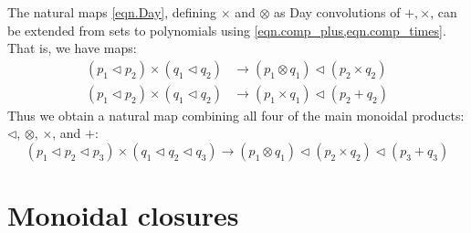 \documentclass[11pt, one side, article]{memoir}
\newcommand{\myred}[1]{{\color{red!60!black}#1}}
\newcommand{\mygreen}[1]{{\color{green!40!black}#1}}
\theoremstyle{definition}
\theoremstyle{plain}
\newcommand{\Cat}[1]{\mathbf{#1}}%
\newcommand{\nn}{\mathbb{N}}
\newcommand{\yon}{\mathcal{y}}
\newcommand{\poly}{\Cat{Poly}}
\newcommand{\0}{\textsf{0}}
\newcommand{\1}{\tn{\textsf{1}}}
\newcommand{\tri}{\mathbin{\triangleleft}}
\begin{document}
The natural maps \eqref{eqn.Day}, defining $\times$ and $\otimes$ as Day convolutions of $+,\times$, can be extended from sets to polynomials using \cref{eqn.comp_plus,eqn.comp_times}. That is, we have maps:
\begin{align}
	(p_1\tri p_2)\times(q_1\tri q_2)&\to(p_1\otimes q_1)\tri(p_2\times q_2)\\
	(p_1\tri p_2)\times(q_1\tri q_2)&\to(p_1\times q_1)\tri(p_2+q_2)
\end{align}
Thus we obtain a natural map combining all four of the main monoidal products: $\tri$, $\otimes$, $\times$, and $+$:
\begin{equation}\label{eqn.allfour}
	(p_1\tri p_2\tri p_3)\times(q_1\tri q_2\tri q_3)\to (p_1\otimes q_1)\tri (p_2\times q_2)\tri(p_3+q_3)
\end{equation}


\chapter{Monoidal closures}
\end{document}
